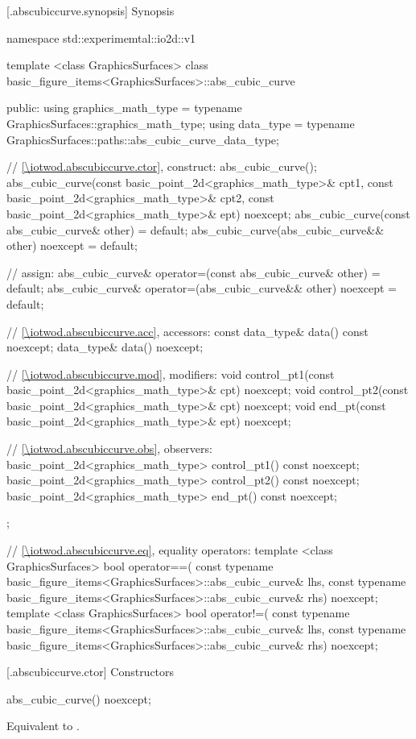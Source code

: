  [\iotwod.abscubiccurve.synopsis] {Synopsis}
\begin{codeblock}
namespace std::experimemtal::io2d::v1 {
  template <class GraphicsSurfaces>
  class basic_figure_items<GraphicsSurfaces>::abs_cubic_curve {
  public:
    using graphics_math_type = typename GraphicsSurfaces::graphics_math_type;
    using data_type =
      typename GraphicsSurfaces::paths::abs_cubic_curve_data_type;

    // \ref{\iotwod.abscubiccurve.ctor}, construct:
    abs_cubic_curve();
    abs_cubic_curve(const basic_point_2d<graphics_math_type>& cpt1,
       const basic_point_2d<graphics_math_type>& cpt2,
       const basic_point_2d<graphics_math_type>& ept) noexcept;
    abs_cubic_curve(const abs_cubic_curve& other) = default;
    abs_cubic_curve(abs_cubic_curve&& other) noexcept = default;

    // assign:
    abs_cubic_curve& operator=(const abs_cubic_curve& other) = default;
    abs_cubic_curve& operator=(abs_cubic_curve&& other) noexcept = default;

    // \ref{\iotwod.abscubiccurve.acc}, accessors:
    const data_type& data() const noexcept;
    data_type& data() noexcept;

    // \ref{\iotwod.abscubiccurve.mod}, modifiers:
    void control_pt1(const basic_point_2d<graphics_math_type>& cpt) noexcept;
    void control_pt2(const basic_point_2d<graphics_math_type>& cpt) noexcept;
    void end_pt(const basic_point_2d<graphics_math_type>& ept) noexcept;

    // \ref{\iotwod.abscubiccurve.obs}, observers:
    basic_point_2d<graphics_math_type> control_pt1() const noexcept;
    basic_point_2d<graphics_math_type> control_pt2() const noexcept;
    basic_point_2d<graphics_math_type> end_pt() const noexcept;
  };

  // \ref{\iotwod.abscubiccurve.eq}, equality operators:
  template <class GraphicsSurfaces>
  bool operator==(
    const typename basic_figure_items<GraphicsSurfaces>::abs_cubic_curve& lhs,
    const typename basic_figure_items<GraphicsSurfaces>::abs_cubic_curve& rhs) 
    noexcept;  
  template <class GraphicsSurfaces>
  bool operator!=(
    const typename basic_figure_items<GraphicsSurfaces>::abs_cubic_curve& lhs,
    const typename basic_figure_items<GraphicsSurfaces>::abs_cubic_curve& rhs) 
    noexcept;  
}
\end{codeblock}

 [\iotwod.abscubiccurve.ctor] {Constructors}%

%
\begin{itemdecl}
abs_cubic_curve() noexcept;
\end{itemdecl}
\begin{itemdescr}
\pnum
\effects
Equivalent to .
\end{itemdescr}

